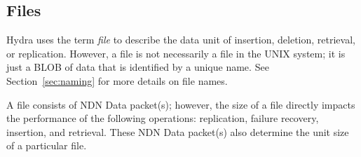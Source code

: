 \subsection{Files} \label{sec:files}
Hydra uses the term \emph{file} to describe the data unit of insertion, deletion, retrieval, or replication. However, a file is not necessarily a file in the UNIX system; it is just a BLOB of data that is identified by a unique name. See Section~\ref{sec:naming} for more details on file names.

A file consists of NDN Data packet(s); however, the size of a file directly impacts the performance of the following operations: replication, failure recovery, insertion, and retrieval. These NDN Data packet(s) also determine the unit size of a particular file.


